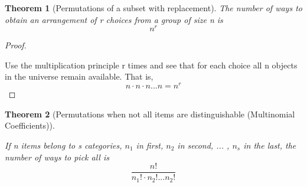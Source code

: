 \documentclass[10pt,]{book}
\theoremstyle{plain}
\newtheorem{theorem}{Theorem}[section]
\theoremstyle{definition}
\theoremstyle{definition}
\theoremstyle{definition}
\numberwithin{equation}{section}
\begin{document}
\begin{theorem}[{Permutations of a subset with replacement}]\label{theorem-6}
The number of ways to obtain an arrangement of r choices from a group of size n is 
		\begin{equation*}n^r\end{equation*}\end{theorem}
\begin{proof}\hypertarget{proof-6}{}

			Use the multiplication principle r times and see that for each choice all n objects in the universe remain available.  That is, 
			\begin{equation*}n \cdot n \cdot n ... n = n^r\end{equation*}
\end{proof}
\begin{theorem}[{Permutations when not all items are distinguishable (Multinomial Coefficients)}]\label{theorem-7}

If n items belong to s categories, \(n_1\) in first, \(n_2\) in second, ... , \(n_s\) in the last, the number of ways to pick all is
		\begin{equation*}\frac{n!}{n_1! \cdot n_2! ... n_2!}\end{equation*}\end{theorem}
\typeout{************************************************}
\typeout{************************************************}
\end{document}
